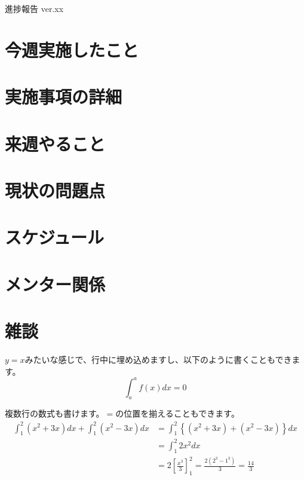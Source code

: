 \documentclass[a4paper,12pt]{ltjsarticle}
\begin{document}
\centerline{\huge 進捗報告 ver.xx}


\section{今週実施したこと}

\section{実施事項の詳細}

\section{来週やること}

\section{現状の問題点}

\section{スケジュール}

\section{メンター関係}

\clearpage
\section{雑談}
$y = x$みたいな感じで、行中に埋め込めますし、以下のように書くこともできます。\\

\begin{equation}
  \int_{a}^{a}f\left(x\right)dx = 0
\end{equation}

複数行の数式も書けます。$=$の位置を揃えることもできます。\\

\begin{align}
  \int_{1}^{2}\left(x^2 + 3x\right)dx + \int_{1}^{2}\left(x^2 - 3x\right)dx &= \int_{1}^{2}\left\{\left(x^2 + 3x\right) + \left(x^2 - 3x\right)\right\}dx \\
  &= \int_{1}^{2}2x^2dx \\
  &= 2\left[\frac{x^3}{3}\right]^2_1 = \frac{2\left(2^3 - 1^3\right)}{3} = \frac{14}{3}
\end{align}
\end{document}
